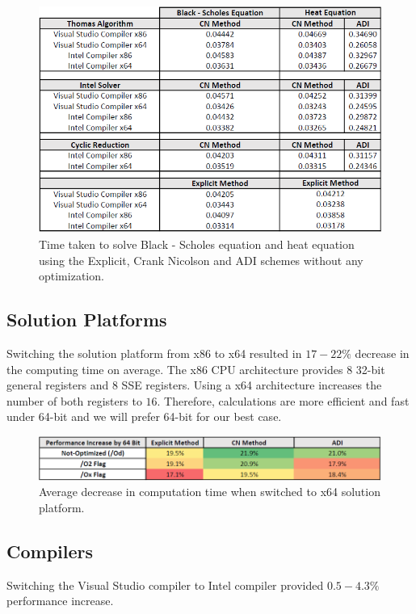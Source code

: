 \documentclass[12pt, oneside]{book}
\theoremstyle{plain}
\theoremstyle{definition}
\begin{document}
\begin{figure}[!htb]
    \centering
        \includegraphics[scale=0.6]{notOptimized.png}
    \caption{Time taken to solve Black - Scholes equation and heat equation using the Explicit, Crank Nicolson and ADI schemes  without any optimization.}
\end{figure}


\subsection{Solution Platforms} 
Switching the solution platform from x86 to x64 resulted in $17 - 22 \%$ decrease in the computing time on average.  The x86 CPU architecture provides $8$ 32-bit general registers and $8$ SSE registers. Using a x64 architecture increases the number of both registers  to $16$. Therefore, calculations are more efficient and fast under 64-bit and we will prefer 64-bit for our best case.

\begin{figure}[!htb]
    \centering
        \includegraphics[scale=0.65]{bitPercent.png}
    \caption{Average decrease in computation time when switched to x64 solution platform.}
    \label{bitPercent}
\end{figure}    

\subsection{Compilers} 
Switching the Visual Studio compiler to Intel compiler provided $0.5 - 4.3 \%$ performance increase. \\
\end{document}

